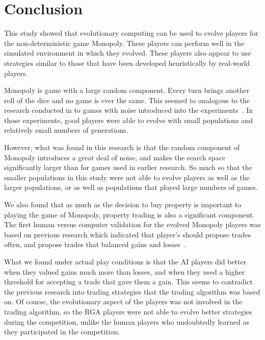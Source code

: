 \clearpage
\chapter{Conclusion}\label{chap:conclusion}

This study showed that evolutionary computing can be used to evolve players for
the non-deterministic game Monopoly. These players can perform well in the
simulated environment in which they evolved. These players also appear to use
strategies similar to those that have been developed heuristically by real-world
players.

Monopoly is game with a large random component. Every turn brings another roll
of the dice and no game is ever the same. This seemed to analogous to the
research conducted in to games with noise introduced into the
experiments~\cite{Panait02acomparative}. In those experiments, good players were
able to evolve with small populations and relatively small numbers of
generations.

However, what was found in this research is that the random component of
Monopoly introduces a great deal of noise, and makes the search space
significantly larger than for games used in earlier research. So much so that
the smaller populations in this study were not able to evolve players as well as
the larger populations, or as well as populations that played large numbers of
games.

We also found that as much as the decision to buy property is important to
playing the game of Monopoly, property trading is also a significant component.
The first human versus computer validation for the evolved Monopoly players was
based on previous research which indicated that player's should propose trades
often, and propose trades that balanced gains and
losses~\cite{Yasumura2001Negotiate}. 

What we found under actual play conditions is that the AI players did better
when they valued gains much more than losses, and when they used a higher
threshold for accepting a trade that gave them a gain. This seems to contradict
the previous research into trading strategies that the trading algorithm was
based on. Of course, the evolutionary aspect of the players was not involved in
the trading algorithm, so the RGA players were not able to evolve better
strategies during the competition, unlike the human players who undoubtedly
learned as they participated in the competition.

